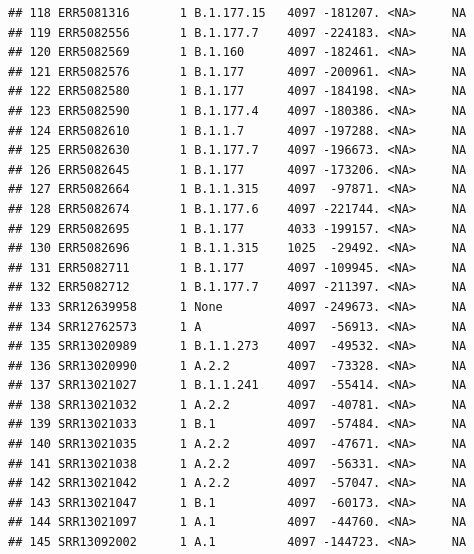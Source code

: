 \documentclass[
]{article}
\begin{document}
\begin{verbatim}
## 118 ERR5081316       1 B.1.177.15   4097 -181207. <NA>     NA
## 119 ERR5082556       1 B.1.177.7    4097 -224183. <NA>     NA
## 120 ERR5082569       1 B.1.160      4097 -182461. <NA>     NA
## 121 ERR5082576       1 B.1.177      4097 -200961. <NA>     NA
## 122 ERR5082580       1 B.1.177      4097 -184198. <NA>     NA
## 123 ERR5082590       1 B.1.177.4    4097 -180386. <NA>     NA
## 124 ERR5082610       1 B.1.1.7      4097 -197288. <NA>     NA
## 125 ERR5082630       1 B.1.177.7    4097 -196673. <NA>     NA
## 126 ERR5082645       1 B.1.177      4097 -173206. <NA>     NA
## 127 ERR5082664       1 B.1.1.315    4097  -97871. <NA>     NA
## 128 ERR5082674       1 B.1.177.6    4097 -221744. <NA>     NA
## 129 ERR5082695       1 B.1.177      4033 -199157. <NA>     NA
## 130 ERR5082696       1 B.1.1.315    1025  -29492. <NA>     NA
## 131 ERR5082711       1 B.1.177      4097 -109945. <NA>     NA
## 132 ERR5082712       1 B.1.177.7    4097 -211397. <NA>     NA
## 133 SRR12639958      1 None         4097 -249673. <NA>     NA
## 134 SRR12762573      1 A            4097  -56913. <NA>     NA
## 135 SRR13020989      1 B.1.1.273    4097  -49532. <NA>     NA
## 136 SRR13020990      1 A.2.2        4097  -73328. <NA>     NA
## 137 SRR13021027      1 B.1.1.241    4097  -55414. <NA>     NA
## 138 SRR13021032      1 A.2.2        4097  -40781. <NA>     NA
## 139 SRR13021033      1 B.1          4097  -57484. <NA>     NA
## 140 SRR13021035      1 A.2.2        4097  -47671. <NA>     NA
## 141 SRR13021038      1 A.2.2        4097  -56331. <NA>     NA
## 142 SRR13021042      1 A.2.2        4097  -57047. <NA>     NA
## 143 SRR13021047      1 B.1          4097  -60173. <NA>     NA
## 144 SRR13021097      1 A.1          4097  -44760. <NA>     NA
## 145 SRR13092002      1 A.1          4097 -144723. <NA>     NA
\end{verbatim}
\end{document}
